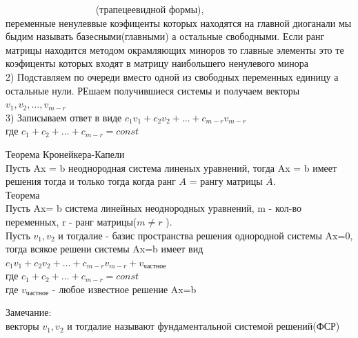 \documentclass[a4paper, 12pt]{article}
\begin{document}
$ \quad \quad \quad \quad \quad \quad \quad \quad \quad  $ (трапецеевидной формы),\\
 переменные ненулеввые коэфиценты которых находятся на главной диоганали мы быдим называть базесными(главными) а остальные свободными. Если ранг матрицы находится методом окрамляющих миноров то главные элементы это те коэфиценты которых входят в матрицу наибольшего ненулевого минора\\
2) Подставляем по очереди вместо одной из свободных переменных единицу а остальные нули. РЕшаем получившиеся системы и получаем векторы $ v_1,v_2,\dots,v_{m-r} $\\
3) Записываем ответ в виде $ c_1v_1 + c_2v_2 + \ldots + c_{m-r}v_{m-r} $\\
где $ c_1 + c_2 + \ldots + c_{m-r} = const$\\

\begin{mdframed}[backgroundcolor=blue!20] 
         Теорема Кронейкера-Капели\\
         Пусть Ax = b неоднородная система линеных уравнений, тогда Ax = b имеет решения тогда и только тогда когда ранг $ A $  = рангу матрицы $ \overline{A} $. \\

         Теорема\\
         Пусть Ax= b система линейных неоднородных уравнений, m - кол-во переменных, r - ранг матрицы($ m \neq r $ ).\\
         Пусть $ v_1,v_2  $ и тогдалие - базис пространства решения однородной системы Ax=0, тогда всякое решени системы Ax=b имеет вид $ c_1v_1 + c_2v_2 + \ldots + c_{m-r}v_{m-r}  + v_{\text{частное}}$ \\
         где $ c_1 + c_2 + \ldots + c_{m-r} = const$\\
         где $ v_{\text{частное}} $ - любое известное решение Ax=b 
      \end{mdframed}
        
\newpage
Замечание:\\
векторы $ v_1,v_2  $ и тогдалие называют фундаментальной системой решений(ФСР)\\
\end{document}
